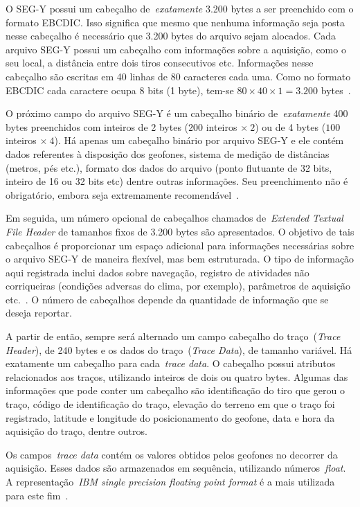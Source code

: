 O SEG-Y possui um cabeçalho de~\emph{exatamente} 3.200 bytes a ser preenchido
com o formato EBCDIC. Isso significa que mesmo que nenhuma informação
seja posta nesse cabeçalho é necessário que 3.200 bytes do arquivo sejam
alocados. Cada arquivo SEG-Y possui um cabeçalho com informações sobre a
aquisição, como o seu local, a distância entre dois tiros consecutivos etc.
Informações nesse cabeçalho são escritas em 40 linhas de 80 caracteres cada uma.
Como no formato EBCDIC cada caractere ocupa 8 bits (1 byte), tem-se $80 \times
40 \times 1 = 3.200$ bytes~\citep{Manual:segy}.

O próximo campo do arquivo SEG-Y é um cabeçalho binário de~\emph{exatamente} 400
bytes preenchidos com inteiros de 2 bytes ($200$ inteiros $\times~2$) ou de 4
bytes ($100$ inteiros $\times~4$). Há apenas um cabeçalho binário por arquivo
SEG-Y e ele contém dados referentes à disposição dos geofones, sistema de
medição de distâncias (metros, pés etc.), formato dos dados do arquivo (ponto
flutuante de 32 bits, inteiro de 16 ou 32 bits etc) dentre outras informações.
Seu preenchimento não é obrigatório, embora seja extremamente
recomendável~\citep{Manual:segy}.

Em seguida, um número opcional de cabeçalhos chamados de~\emph{Extended Textual
File Header} de tamanhos fixos de 3.200 bytes são apresentados. O objetivo de
tais cabeçalhos é proporcionar um espaço adicional para informações necessárias
sobre o arquivo SEG-Y de maneira flexível, mas bem estruturada. O tipo de
informação aqui registrada inclui dados sobre navegação, registro de atividades
não corriqueiras (condições adversas do clima, por exemplo), parâmetros de
aquisição etc.~\citep{Manual:segy}. O número de cabeçalhos depende da quantidade
de informação que se deseja reportar.

A partir de então, sempre será alternado um campo cabeçalho do
traço~(\emph{Trace Header}), de 240 bytes e os dados do traço~(\emph{Trace
Data}), de tamanho variável. Há exatamente um cabeçalho para cada~\emph{trace
data}. O cabeçalho possui atributos relacionados aos traços, utilizando inteiros
de dois ou quatro bytes. Algumas das informações que pode conter um cabeçalho
são identificação do tiro que gerou o traço, código de identificação do traço,
elevação do terreno em que o traço foi registrado, latitude e longitude do
posicionamento do geofone, data e hora da aquisição do traço, dentre outros.

Os campos~\emph{trace data} contém os valores obtidos pelos geofones no decorrer
da aquisição. Esses dados são armazenados em sequência, utilizando
números~\emph{float}. A representação~\emph{IBM single precision floating point
format} é a mais utilizada para este fim~\citep{tp:bitmask}.